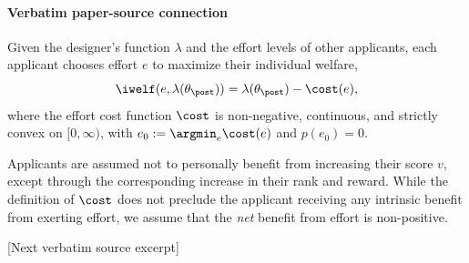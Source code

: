 \documentclass[10pt]{article}
\begin{document}
\paragraph{Verbatim paper-source connection}
\begin{ReviewVerbatim}
 Given the designer's function $\lambda$ and the effort levels of other applicants, each applicant chooses effort $e$ to maximize their individual welfare, %
\begin{equation*}
	\iwelf(e, \lambda(\theta_\post)) = \lambda(\theta_\post) - \cost(e),
\end{equation*}
where the effort cost function $\cost$ is non-negative, continuous, and strictly convex {on $[0,\infty)$, with $e_0:=\argmin_e \cost(e)$ and $p(e_0) = 0$.}

Applicants are assumed not to personally benefit from increasing their score $v$, except through the corresponding increase in their rank and reward. While the definition of $\cost$ does not preclude the applicant receiving any intrinsic benefit from exerting effort, we assume that the \emph{net} benefit from effort is non-positive.

[Next verbatim source excerpt]


\end{ReviewVerbatim}
\end{document}
